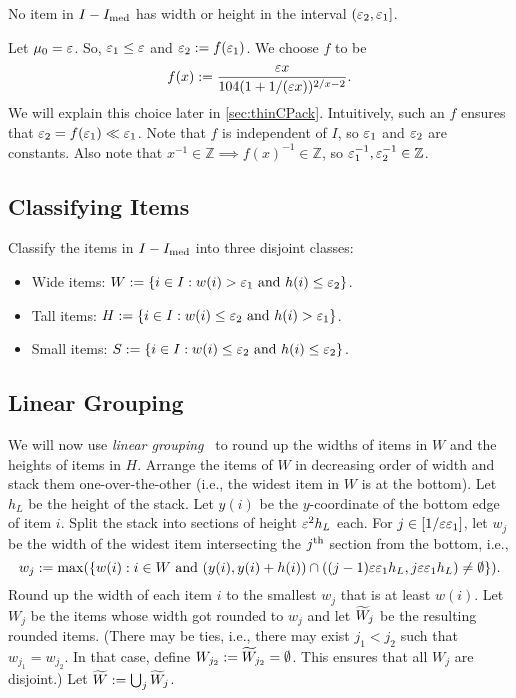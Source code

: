 No item in $I - I_{\mathrm{med}}$ has width or height in the interval $(\varepsilon_2, \varepsilon_1]$.

Let $\mu_0 = \varepsilon$. So, $\varepsilon_1 \le \varepsilon$ and $\varepsilon_2 := f(\varepsilon_1)$.
We choose $f$ to be
\begin{equation}
\label{eqn:thin-bp:remmed-func}
f(x) := \frac{\varepsilon x}{104(1+1/(\varepsilon x))^{2/x-2}}.
\end{equation}
We will explain this choice later in \cref{sec:thinCPack}.
Intuitively, such an $f$ ensures that $\varepsilon_2 = f(\varepsilon_1) \ll \varepsilon_1$.
Note that $f$ is independent of $I$, so $\varepsilon_1$ and $\varepsilon_2$ are constants.
Also note that $x^{-1} \in \mathbb{Z} \implies f(x)^{-1} \in \mathbb{Z}$,
so $\varepsilon_1^{-1}, \varepsilon_2^{-1} \in \mathbb{Z}$.

\subsection{Classifying Items}

Classify the items in $I - I_{\mathrm{med}}$ into three disjoint classes:
\begin{itemize}
\item Wide items: $W := \{i \in I: w(i) > \varepsilon_1 \textrm{ and } h(i) \le \varepsilon_2 \}$.
\item Tall items: $H := \{i \in I: w(i) \le \varepsilon_2 \textrm{ and } h(i) > \varepsilon_1 \}$.
\item Small items: $S := \{i \in I: w(i) \le \varepsilon_2 \textrm{ and } h(i) \le \varepsilon_2 \}$.
\end{itemize}

\subsection{Linear Grouping}

We will now use \emph{linear grouping}~\cite{bp-aptas,kenyon1996strip}
to round up the widths of items in $W$ and the heights of items in $H$.
Arrange the items of $W$ in decreasing order of width and stack them
one-over-the-other (i.e., the widest item in $W$ is at the bottom).
Let $h_L$ be the height of the stack.
Let $y(i)$ be the $y$-coordinate of the bottom edge of item $i$.
Split the stack into sections of height $\varepsilon^2h_L$ each.
For $j \in [1/\varepsilon\varepsilon_1]$, let $w_j$ be the width of the
widest item intersecting the $j^{\textrm{th}}$ section from the bottom, i.e.,
\[ w_j := \max(\{w(i): i \in W \textrm{ and } (y(i), y(i) + h(i))
    \cap ((j-1)\varepsilon\varepsilon_1 h_L, j\varepsilon\varepsilon_1 h_L) \neq \emptyset\}). \]
Round up the width of each item $i$ to the smallest $w_j$ that is at least $w(i)$.
Let $W_j$ be the items whose width got rounded to $w_j$
and let $\widetilde{W}_j$ be the resulting rounded items.
(There may be ties, i.e., there may exist $j_1 < j_2$ such that $w_{j_1} = w_{j_2}$.
In that case, define $W_{j_2} := \widetilde{W}_{j_2} = \emptyset$.
This ensures that all $W_j$ are disjoint.)
Let $\widetilde{W} := \bigcup_j \widetilde{W}_j$.

